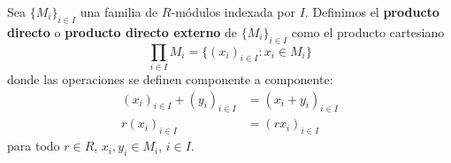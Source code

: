 %
%
%

\begin{definicion}
	Sea \(\{M_{i}\}_{i \in I}\) una familia de \(R\)-módulos indexada por \(I\).
	Definimos el \textbf{producto directo} o \textbf{producto directo externo} de
	\(\{M_{i}\}_{i \in I}\) como el producto cartesiano
	\[
	\prod_{i \in I}M_{i}= \{(x_{i})_{i \in I}: x_{i}\in M_{i}\}
	\]
	donde las operaciones se definen componente a componente:
	\begin{align*}
		(x_{i})_{i \in I}+ (y_{i})_{i \in I} & = (x_{i}+y_{i})_{i \in I} \\
		r(x_{i})_{i \in I}                   & = (rx_{i})_{i \in I}
	\end{align*}
	para todo \(r \in R\), \(x_{i},y_{i}\in M_{i}\), \(i \in I\).
\end{definicion}

